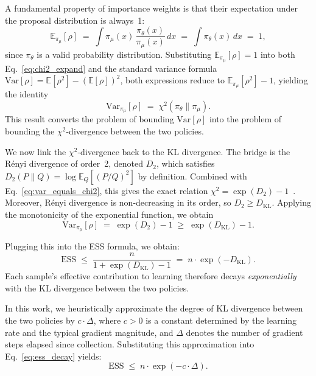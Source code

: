 \documentclass[runningheads]{llncs}
\begin{document}
A fundamental property of importance weights is that their expectation under the proposal distribution is always~1:
\begin{equation}
    \mathbb{E}_{\pi_\mu}[\rho]
    \;=\; \int \pi_\mu(x)\,\frac{\pi_\theta(x)}{\pi_\mu(x)}\,dx
    \;=\; \int \pi_\theta(x)\,dx \;=\; 1,
    \label{eq:rho_mean_one}
\end{equation}
since $\pi_\theta$ is a valid probability distribution.
Substituting $\mathbb{E}_{\pi_\mu}[\rho] = 1$ into both Eq.~\eqref{eq:chi2_expand} and the standard variance formula $\mathrm{Var}[\rho] = \mathbb{E}[\rho^2] - (\mathbb{E}[\rho])^2$, both expressions reduce to $\mathbb{E}_{\pi_\mu}[\rho^2] - 1$, yielding the identity
\begin{equation}
    \mathrm{Var}_{\pi_\mu}[\rho]
    \;=\; \chi^2\!\left(\pi_\theta \| \pi_\mu\right).
    \label{eq:var_equals_chi2}
\end{equation}
This result converts the problem of bounding $\mathrm{Var}[\rho]$ into the problem of bounding the $\chi^2$-divergence between the two policies.

We now link the $\chi^2$-divergence back to the KL divergence.
The bridge is the R\'{e}nyi divergence of order~2, denoted $D_2$, which satisfies $D_2(P\|Q) = \log\mathbb{E}_Q[({P}/{Q})^2]$ by definition.
Combined with Eq.~\eqref{eq:var_equals_chi2}, this gives the exact relation $\chi^2 = \exp(D_2) - 1$~\cite{metelli2020importance}.
Moreover, R\'{e}nyi divergence is non-decreasing in its order, so $D_2 \geq D_{\mathrm{KL}}$.
Applying the monotonicity of the exponential function, we obtain
\begin{equation}
    \mathrm{Var}_{\pi_\mu}[\rho]
    \;=\; \exp(D_2) - 1
    \;\geq\; \exp(D_{\mathrm{KL}}) - 1.
    \label{eq:var_chain}
\end{equation}

Plugging this into the ESS formula, we obtain:
\begin{equation}
    \mathrm{ESS}
    \;\leq\; \frac{n}{1 + \exp(D_{{\mathrm{KL}}}) - 1}
    \;=\; n \cdot \exp(-D_{{\mathrm{KL}}}).
    \label{eq:ess_decay}
\end{equation}
Each sample's effective contribution to learning therefore decays \emph{exponentially} with the KL divergence between the two policies.

In this work, we heuristically approximate the degree of KL divergence between the two policies by $c \cdot \Delta$, where $c > 0$ is a constant determined by the learning rate and the typical gradient magnitude, and $\Delta$ denotes the number of gradient steps elapsed since collection. Substituting this approximation into Eq.~\eqref{eq:ess_decay} yields:
\begin{equation}
    \mathrm{ESS} \;\le\; n \cdot \exp(-c \cdot \Delta).
    \label{eq:ess_decay_final}
\end{equation}
\end{document}
